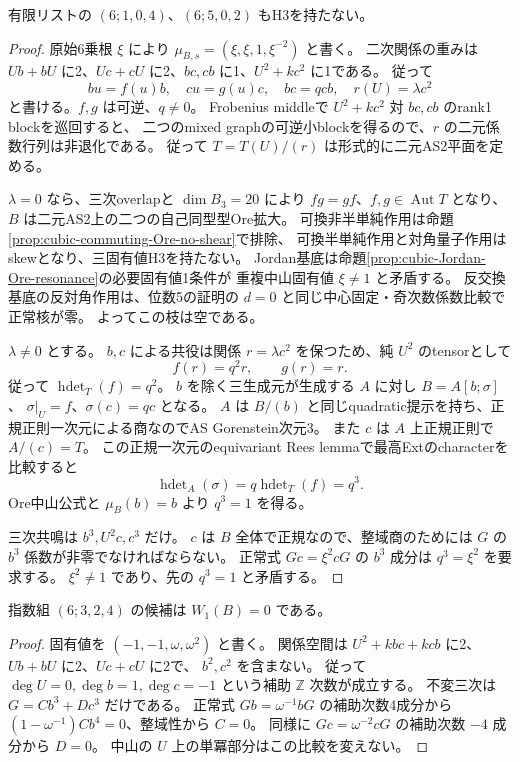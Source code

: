\begin{theorem}[位数6の二つの曲率スペクトルの排除]
\label{thm:cubic-sixth-root-curvature-empty}
有限リストの $(6;1,0,4)$、$(6;5,0,2)$ もH3を持たない。
\end{theorem}
\begin{proof}
原始6乗根 $\xi$ により $\mu_{B,s}=(\xi,\xi,1,\xi^{-2})$ と書く。
二次関係の重みは $Ub+bU$ に2、$Uc+cU$ に2、$bc,cb$ に1、$U^2+kc^2$ に1である。
従って
\[
 bu=f(u)b,\quad cu=g(u)c,\quad bc=qcb,\quad r(U)=\lambda c^2
\]
と書ける。$f,g$ は可逆、$q\ne0$。
Frobenius middleで $U^2+kc^2$ 対 $bc,cb$ のrank1 blockを巡回すると、
二つのmixed graphの可逆小blockを得るので、$r$ の二元係数行列は非退化である。
従って $T=T(U)/(r)$ は形式的に二元AS2平面を定める。

$\lambda=0$ なら、三次overlapと $\dim B_3=20$ により
$fg=gf$、$f,g\in\operatorname{Aut}T$ となり、$B$ は二元AS2上の二つの自己同型型Ore拡大。
可換非半単純作用は命題\ref{prop:cubic-commuting-Ore-no-shear}で排除、
可換半単純作用と対角量子作用はskewとなり、三固有値H3を持たない。
Jordan基底は命題\ref{prop:cubic-Jordan-Ore-resonance}の必要固有値1条件が
重複中山固有値 $\xi\ne1$ と矛盾する。
反交換基底の反対角作用は、位数5の証明の $d=0$ と同じ中心固定・奇次数係数比較で正常核が零。
よってこの枝は空である。

$\lambda\ne0$ とする。
$b,c$ による共役は関係 $r=\lambda c^2$ を保つため、純 $U^2$ のtensorとして
\[
 f(r)=q^2r,\qquad g(r)=r.
\]
従って $\operatorname{hdet}_T(f)=q^2$。
$b$ を除く三生成元が生成する $A$ に対し $B=A[b;\sigma]$、
$\sigma|_U=f$、$\sigma(c)=q c$ となる。
$A$ は $B/(b)$ と同じquadratic提示を持ち、正規正則一次元による商なのでAS Gorenstein次元3。
また $c$ は $A$ 上正規正則で $A/(c)=T$。
この正規一次元のequivariant Rees lemmaで最高Extのcharacterを比較すると
\[
 \operatorname{hdet}_A(\sigma)=q\operatorname{hdet}_T(f)=q^3.
\]
Ore中山公式と $\mu_B(b)=b$ より $q^3=1$ を得る。

三次共鳴は $b^3,U^2c,c^3$ だけ。
$c$ は $B$ 全体で正規なので、整域商のためには $G$ の $b^3$ 係数が非零でなければならない。
正常式 $Gc=\xi^2cG$ の $b^3$ 成分は $q^3=\xi^2$ を要求する。
$\xi^2\ne1$ であり、先の $q^3=1$ と矛盾する。
\end{proof}

\begin{proposition}[位数6の反対重複固有値の正常核消滅]
\label{prop:cubic-sixth-root-opposite-repeat-empty}
指数組 $(6;3,2,4)$ の候補は $W_1(B)=0$ である。
\end{proposition}
\begin{proof}
固有値を $(-1,-1,\omega,\omega^2)$ と書く。
関係空間は $U^2+kbc+kcb$ に2、$Ub+bU$ に2、$Uc+cU$ に2で、
$b^2,c^2$ を含まない。
従って $\deg U=0,\deg b=1,\deg c=-1$ という補助 $\mathbb Z$ 次数が成立する。
不変三次は $G=C b^3+D c^3$ だけである。
正常式 $Gb=\omega^{-1}bG$ の補助次数4成分から
$(1-\omega^{-1})C b^4=0$、整域性から $C=0$。
同様に $Gc=\omega^{-2}cG$ の補助次数 $-4$ 成分から $D=0$。
中山の $U$ 上の単冪部分はこの比較を変えない。
\end{proof}

